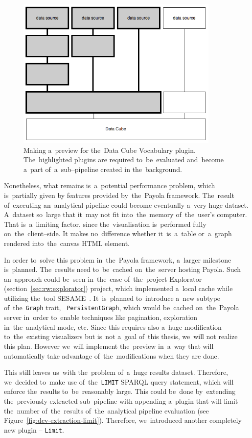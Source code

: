 \begin{figure}
	\centering
	\includegraphics[width=100mm]{img/dcv-extraction.png}
	\caption{Making a~preview for the~Data Cube Vocabulary plugin. The~highlighted
	plugins are required to~be~evaluated and~become a~part of~a~sub--pipeline created
	in the~background.}
	\label{fig:dcv-extraction}
\end{figure}

Nonetheless, what remains is~a~potential performance problem, which is~partially given 
by features provided by~the~Payola framework. The~result of~executing an~analytical pipeline could become eventually a~very huge dataset. A~dataset so~large that it~may not fit into~the~memory of~the~user's computer. That is~a~limiting factor, since the~visualisation is~performed fully on~the~client--side. 
It makes no~difference whether it~is~a~table or~a~graph rendered into~the~canvas HTML element.

In order to~solve this problem in~the~Payola framework, a~larger milestone is~planned. The~results need to~be~cached on~the~server hosting Payola.
Such an~approach could be~seen in~the~case of~the~project 
Explorator (section~\ref{sec:rw:explorator}) project, which implemented a~local cache
while utilizing the~tool SESAME~\cite{sesame}. It~is~planned to~introduce a~new 
subtype of~the~\texttt{Graph} trait, ~\texttt{PersistentGraph}, which would be~cached on~the~Payola server in~order to~enable techniques like pagination, 
exploration in~the~analytical mode, etc. Since this requires also a~huge 
modification to~the~existing visualizers but is~not a~goal of~this thesis, we~will 
not realize this plan. However we~will implement the~preview in~a~way that will 
automatically take advantage of~the~modifications when they are done.

This still leaves us~with the~problem of~a~huge results dataset. Therefore, we~decided to~make use of~the~\texttt{LIMIT} SPARQL query statement, which will 
enforce the~results to~be~reasonably large. This could be~done by~extending the~previously extracted sub--pipeline with appending a~plugin that 
will limit the~number of~the~results of~the~analytical
pipeline evaluation (see Figure~\ref{fig:dcv-extraction-limit}). Therefore, we~introduced another completely new plugin -- \texttt{Limit}.

